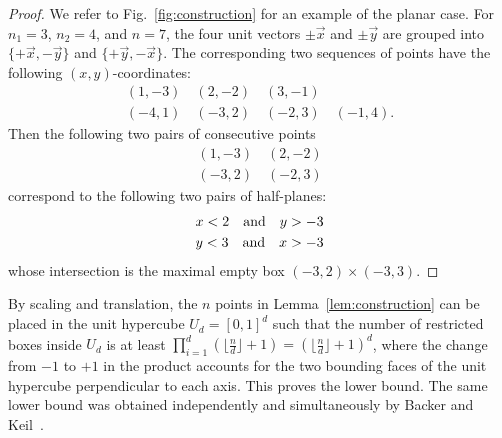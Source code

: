 \documentclass[11pt]{article}
\begin{document}
\begin{proof}
We refer to Fig.~\ref{fig:construction} for an example of the planar case.
For $n_1 = 3$, $n_2 = 4$, and $n = 7$,
the four unit vectors $\pm\vec x$ and $\pm\vec y$ are grouped into
$\{+\vec x, -\vec y\}$ and $\{+\vec y, -\vec x\}$.
The corresponding two sequences of points have the following
$(x,y)$-coordinates:  
\begin{gather*}
(1, -3) \quad (2, -2) \quad (3, -1)
\\
(-4, 1) \quad (-3, 2) \quad (-2, 3) \quad (-1, 4).
\end{gather*}
Then the following two pairs of consecutive points
\begin{gather*}
(1, -3) \quad (2, -2)
\\
(-3, 2) \quad (-2, 3)
\end{gather*}
correspond to the following two pairs of half-planes:
\begin{gather*}
x < 2
\quad\textup{and}\quad
y > -3
\\
y < 3
\quad\textup{and}\quad
x > -3
\end{gather*}
whose intersection is the maximal empty box $(-3, 2) \times (-3, 3)$.
\end{proof}

By scaling and translation, the $n$ points in Lemma~\ref{lem:construction}
can be placed in the unit hypercube $U_d = [0,1]^d$ such that
the number of restricted boxes inside $U_d$ is at least
$\prod_{i=1}^d (\lfloor \frac{n}{d} \rfloor + 1)
= (\lfloor \frac{n}{d} \rfloor + 1)^d$,
where the change from $-1$ to $+1$ in the product
accounts for the two bounding faces of the unit hypercube
perpendicular to each axis.
This proves the lower bound. The same lower bound was obtained
independently and simultaneously by Backer and Keil~\cite{Ba09,BK09a,BK09b}.
\end{document}
